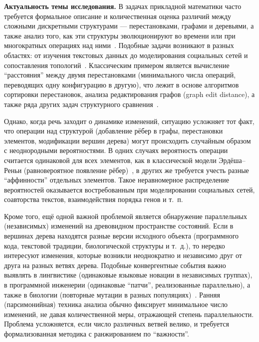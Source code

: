 

\textbf{Актуальность темы исследования.}  
В задачах прикладной математики часто требуется формальное описание и количественная оценка различий между сложными дискретными структурами --- перестановками, графами и деревьями, а также анализ того, как эти структуры эволюционируют во времени или при многократных операциях над ними~\cite{Penny2004,Bunke1997}.  
Подобные задачи возникают в разных областях: от изучения текстовых данных до моделирования социальных сетей и сопоставления топологий~\cite{baret2004phylogenetic,McCollum2023,Piar2020,Newman2003}.  
Классическим примером является вычисление ``расстояния'' между двумя перестановками (минимального числа операций, переводящих одну конфигурацию в другую), что лежит в основе алгоритмов сортировки перестановок, анализа редактирования графов (graph edit distance), а также ряда других задач структурного сравнения~\cite{Pevzner03}.  

Однако, когда речь заходит о динамике изменений, ситуацию усложняет тот факт, что операции над структурой (добавление рёбер в графы, перестановки элементов, модификации вершин дерева) могут происходить случайным образом с неоднородными вероятностями.  
В одних случаях вероятность операции считается одинаковой для всех элементов, как в классической модели \mbox{Эрдёша--Реньи} (равновероятное появление рёбер)~\cite{Erdos1959}, в других же требуется учесть разные ``аффинности'' отдельных элементов.  
Такое неравномерное распределение вероятностей оказывается востребованным при моделировании социальных сетей, соавторства текстов, взаимодействия порядка генов и т.~п.  

Кроме того, ещё одной важной проблемой является обнаружение параллельных (независимых) изменений на древовидном пространстве состояний.  
Если в вершинах дерева находятся разные версии исходного объекта (программного кода, текстовой традиции, биологической структуры и т.~д.), то нередко интересуют изменения, которые возникли неоднократно и независимо друг от друга на разных ветвях дерева.  
Подобные конвергентные события важно выявлять в лингвистике (одинаковые языковые новации в независимых группах), в программной инженерии (одинаковые ``патчи'', реализованные параллельно), а также в биологии (повторные мутации в разных популяциях)~\cite{Rokas2008}.  
Ранняя (парсимонийная) техника анализа обычно фиксирует минимальное число изменений, не давая количественной меры, отражающей степень параллельности.  
Проблема усложняется, если число различных ветвей велико, и требуется формализованная методика с ранжированием по ``важности''. 

